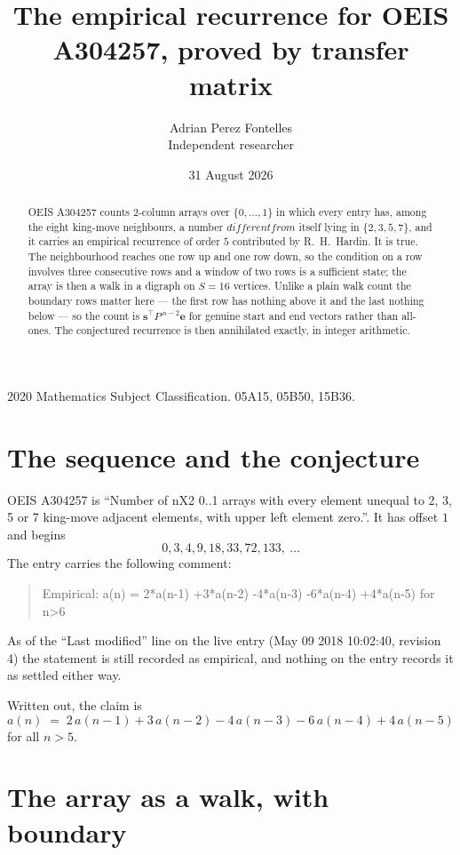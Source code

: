 \documentclass[11pt,a4paper]{article}
\title{The empirical recurrence for OEIS A304257, proved by transfer matrix}
\author{Adrian Perez Fontelles\\ \small Independent researcher}
\date{31 August 2026}
\theoremstyle{plain}
\theoremstyle{definition}
\begin{document}
\maketitle

\begin{abstract}
OEIS A304257 counts $2$-column arrays over $\{0,\dots,1\}$ in which every entry has,
among the eight king-move neighbours, a number $different from$ itself lying in $\{2,3,5,7\}$, and it carries an empirical
recurrence of order $5$ contributed by R.~H.~Hardin. It is true. The neighbourhood
reaches one row up and one row down, so the condition on a row involves three consecutive
rows and a window of two rows is a sufficient state; the array is then a walk in a digraph
on $S=16$ vertices. Unlike a plain walk count the boundary rows matter here --- the first
row has nothing above it and the last nothing below --- so the count is
$\mathbf{s}^{\!\top}P^{\,n-2}\mathbf{e}$ for genuine start and end vectors rather than
all-ones. The conjectured recurrence is then annihilated exactly, in integer arithmetic.
\end{abstract}

\noindent\small 2020 Mathematics Subject Classification. 05A15, 05B50, 15B36.\normalsize

\section{The sequence and the conjecture}

OEIS A304257 is ``Number of nX2 0..1 arrays with every element unequal to 2, 3, 5 or 7 king-move adjacent elements, with upper left element zero.''. It has offset
$1$ and begins
\[
0, 3, 4, 9, 18, 33, 72, 133,\ \dots
\]
The entry carries the following comment:
\begin{quote}\small
Empirical: a(n) = 2*a(n-1) +3*a(n-2) -4*a(n-3) -6*a(n-4) +4*a(n-5) for n>6
\end{quote}
As of the ``Last modified'' line on the live entry (May 09 2018 10:02:40, revision
4) the statement is still recorded as empirical, and nothing on the entry
records it as settled either way.

Written out, the claim is
\begin{equation}\label{eq:conj}
a(n)\;=\;2\,a(n-1) + 3\,a(n-2) - 4\,a(n-3) - 6\,a(n-4) + 4\,a(n-5)
\end{equation}
for all $n>5$.

\section{The array as a walk, with boundary}
\end{document}
